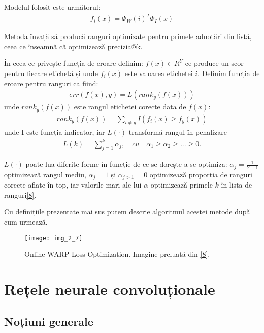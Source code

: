 Modelul folosit este următorul:
\begin{align}
	f_{i}(x) = \Phi_{W}(i)^T \Phi_{I}(x)
\end{align}

Metoda învață să producă ranguri optimizate pentru primele adnotări din listă, ceea ce înseamnă că optimizează precizia@k.

În ceea ce privește funcția de eroare definim: $f(x) \in R^Y$ ce produce un scor pentru fiecare etichetă și unde $f_i(x)$ este valoarea etichetei $i$. Definim funcția de eroare pentru ranguri ca fiind:
\begin{align}
	err(f(x),y) = L(rank_y(f(x)))
\end{align}
unde $rank_y(f(x))$ este rangul etichetei corecte data de $f(x)$:
\begin{align}
	rank_y(f(x)) = \sum_{i \neq y}I(f_i(x) \geq f_y(x))
\end{align}
unde I este funcția indicator, iar $L(\cdot)$ transformă rangul în penalizare
\begin{align}
	L(k) = \sum_{j=1}^k\alpha_j, \quad cu \quad \alpha_1 \geq \alpha_2 \geq ... \geq 0.
\end{align}

$L(\cdot)$ poate lua diferite forme în funcție de ce se dorește a se optimiza: $\alpha_j=\frac{1}{Y-1}$ optimizează rangul mediu, $\alpha_j=1$ și $\alpha_{j>1}=0$ optimizează proporția de ranguri corecte aflate în top, iar valorile mari ale lui $\alpha$ optimizează primele $k$ în lista de ranguri\hyperlink{JasonWestonSamyBengioNicolasUsunier}{[8]}.

\vspace{5mm}

Cu definițiile prezentate mai sus putem descrie algoritmul acestei metode după cum urmează.

\begin{figure}[!h]
	\centering
	\texttt{[image: img\_2\_7]}
	\caption[Online WARP Loss Optimization]{Online WARP Loss Optimization. Imagine preluată din \hyperlink{JasonWestonSamyBengioNicolasUsunier}{[8]}.}
\end{figure} 

\section{Rețele neurale convoluționale}

\subsection{Noțiuni generale}

